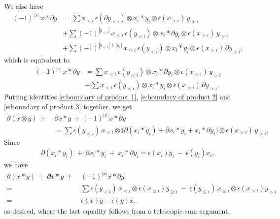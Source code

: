 We also have
\begin{align*}
(-1)^{|x|} \, x \ast \partial y & =
\sum x_{<i} \, \epsilon(\partial y_{<i}) \otimes x_i \ast y_i \otimes \epsilon(x_{>i})\, y_{>i} \\ & +
\sum (-1)^{|y_{<i}|} \, x_{<i}\, \epsilon(y_{<i}) \otimes x_i \ast \partial y_i \otimes \epsilon(x_{>i}) \, y_{>i} \\ & +
\sum (-1)^{|y_{<i}| + |y_i|} \, x_{<i}\, \epsilon(y_{<i}) \otimes x_i \ast y_i \otimes \epsilon(x_{>i}) \, \partial y_{>i},
\end{align*}
which is equivalent to
\begin{equation} \label{e:boundary of product 3}
\begin{split}
(-1)^{|x|} \, x \ast \partial y & =
\sum x_{<i} \, \epsilon(y_{<i}) \otimes x_i \ast \partial y_i \otimes \epsilon(x_{>i})\, y_{>i} \\ & +
\sum x_{<i}\, \epsilon(y_{<i}) \otimes x_i \ast y_i \otimes \epsilon(x_{>i})\, \partial y_{>i}.
\end{split}
\end{equation}
Putting identities \eqref{e:boundary of product 1}, \eqref{e:boundary of product 2} and \eqref{e:boundary of product 3} together, we get
\begin{align*}
\partial (x \otimes y) \ +\ & \partial x \ast y\ +\, (-1)^{|x|}x \ast \partial y \\
& = \sum \epsilon(y_{<i})\, x_{<i} \otimes \big(\partial(x_i \ast y_i) + \partial x_i \ast y_i + x_i \ast \partial y_i\big) \otimes \epsilon(x_{>i})\, y_{>i}.
\end{align*}
Since
\begin{align*}
\partial(x_i \ast y_i)\ +\ \partial x_i \ast y_i\ +\ x_i \ast \partial y_i =
\epsilon(x_i)y_i\ -\ \epsilon(y_i)x_i,
\end{align*}
we have
\begin{align*}
\partial (x \ast y) \ +\ \partial x \ast y\ +\ & (-1)^{|x|}x \ast \partial y \\ = \ &
\sum \epsilon(y_{<i}) \, x_{<i} \otimes \epsilon(x_{\geq i}) y_{\geq i}\ -\
\epsilon(y_{\leq i}) \, x_{\leq i} \otimes \epsilon(x_{>i}) y_{>i} \\ = \ &
\epsilon(x)y - \epsilon(y)x,
\end{align*}
as desired, where the last equality follows from a telescopic sum argument.